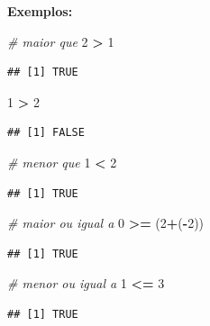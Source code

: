 \documentclass[
]{book}
\newenvironment{Shaded}{\begin{snugshade}}{\end{snugshade}}
\newcommand{\CommentTok}[1]{\textcolor[rgb]{0.56,0.35,0.01}{\textit{#1}}}
\newcommand{\DecValTok}[1]{\textcolor[rgb]{0.00,0.00,0.81}{#1}}
\newcommand{\NormalTok}[1]{#1}
\newcommand{\SpecialCharTok}[1]{\textcolor[rgb]{0.81,0.36,0.00}{\textbf{#1}}}
\begin{document}
\textbf{Exemplos:}

\begin{Shaded}
\begin{Highlighting}[]
\CommentTok{\# maior que }
\DecValTok{2} \SpecialCharTok{\textgreater{}} \DecValTok{1}
\end{Highlighting}
\end{Shaded}

\begin{verbatim}
## [1] TRUE
\end{verbatim}

\begin{Shaded}
\begin{Highlighting}[]
\DecValTok{1} \SpecialCharTok{\textgreater{}} \DecValTok{2}
\end{Highlighting}
\end{Shaded}

\begin{verbatim}
## [1] FALSE
\end{verbatim}

\begin{Shaded}
\begin{Highlighting}[]
\CommentTok{\# menor que}
\DecValTok{1} \SpecialCharTok{\textless{}} \DecValTok{2}
\end{Highlighting}
\end{Shaded}

\begin{verbatim}
## [1] TRUE
\end{verbatim}

\begin{Shaded}
\begin{Highlighting}[]
\CommentTok{\# maior ou igual a}
\DecValTok{0} \SpecialCharTok{\textgreater{}=}\NormalTok{ (}\DecValTok{2}\SpecialCharTok{+}\NormalTok{(}\SpecialCharTok{{-}}\DecValTok{2}\NormalTok{))}
\end{Highlighting}
\end{Shaded}

\begin{verbatim}
## [1] TRUE
\end{verbatim}

\begin{Shaded}
\begin{Highlighting}[]
\CommentTok{\# menor ou igual a }
\DecValTok{1} \SpecialCharTok{\textless{}=} \DecValTok{3}
\end{Highlighting}
\end{Shaded}

\begin{verbatim}
## [1] TRUE
\end{verbatim}
\end{document}
